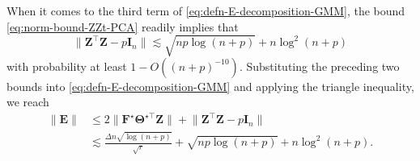 When it comes to the third term of \eqref{eq:defn-E-decomposition-GMM},
the bound \eqref{eq:norm-bound-ZZt-PCA} readily implies that
%
\[
	\big\|\bm{Z}^{\top}\bm{Z}-p\bm{I}_n\big\|  \lesssim  \sqrt{np\log(n+p)}+n\log^{2}(n+p)
\]
%
with probability at least $1-O((n+p)^{-10})$.
Substituting the preceding two bounds into \eqref{eq:defn-E-decomposition-GMM} and applying the triangle inequality, we reach
%
\begin{align*}
\|\bm{E}\| & \leq2\big\|\bm{F}^{\star}\bm{\Theta}^{\star\top}\bm{Z}\big\|+\big\|\bm{Z}^{\top}\bm{Z}-p\bm{I}_n\big\|\\
 & \lesssim\frac{\Delta n\sqrt{\log(n+p)}}{\sqrt{r}}+\sqrt{np\log(n+p)}+n\log^{2}(n+p) .
\end{align*}
%









